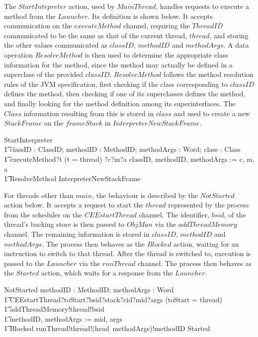 The $StartIntepreter$ action, used by $MainThread$, handles requests
to execute a method from the $Launcher$.
Its definition is shown below.
It accepts communication on the $executeMethod$ channel, requiring the
$ThreadID$ communicated to be the same as that of the current thread,
$thread$, and storing the other values communicated as $classID$,
$methodID$ and $methodArgs$.
A data operation $ResolveMethod$ is then used to determine the
appropriate class information for the method, since the method may
actually be defined in a superclass of the provided $classID$.
$ResolveMethod$ follows the method resolution rules of the JVM
specification, first checking if the class corresponding to $classID$
defines the method, then checking if one of its superclasses defines
the method, and finally looking for the method definition among its
superinterfaces.
The $Class$ information resulting from this is stored in $class$ and
used to create a new $StackFrame$ on the $frameStack$ in
$InterpreterNewStackFrame$.
\begin{circusaction}
  StartInterpreter \circdef \\
  \t1  \circvar classID : ClassID; methodID : MethodID; methodArgs : \seq Word; class : Class \circspot \\
  \t1 executeMethod?t \prefixcolon (t = thread) ?c?m?a \then classID, methodID, methodArgs := c, m, a \circseq \\
  \t1 \lschexpract ResolveMethod \rschexpract \circseq \lschexpract InterpreterNewStackFrame \rschexpract
\end{circusaction}

For threads other than $main$, the behaviour is described by the
$NotStarted$ action below.
It accepts a request to start the $thread$ represented by the process
from the scheduler on the $CEEstartThread$ channel.
The identifier, $bsid$, of the thread's backing store is then passed
to $ObjMan$ via the $addThreadMemory$ channel.
The remaining information is stored in $classID$, $methodID$ and
$methodArgs$. 
The process then behaves as the $Blocked$ action, waiting for an
instruction to switch to that thread.
After the thread is switched to, execution is passed to the $Launcher$
via the $runThread$ channel.
The process then behaves as the $Started$ action, which waits for a
response from the $Launcher$.
\begin{circusaction}
  NotStarted \circdef \circvar methodID : MethodID; methodArgs : \seq Word \circspot \\
  \t1 CEEstartThread?toStart?bsid?stack?cid?mid?args \prefixcolon (toStart = thread) \\
  \t1 {} \then addThreadMemory!thread!bsid \\
  \t1 {} \then methodID, methodArgs := mid, args \circseq \\
  \t1 Blocked \circseq runThread!thread!(head~methodArgs)!methodID \then Started
\end{circusaction}

